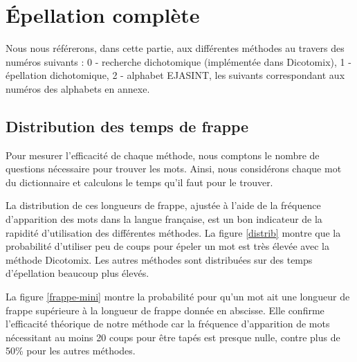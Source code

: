\documentclass[twoside,twocolumn]{article}
\begin{document}

\section{Épellation complète}

Nous nous référerons, dans cette partie, aux différentes méthodes au travers des numéros suivants : 0 - recherche dichotomique (implémentée dans Dicotomix), 1 - épellation dichotomique, 2 - alphabet EJASINT, les suivants correspondant aux numéros des alphabets en annexe.

\subsection{Distribution des temps de frappe}

Pour mesurer l'efficacité de chaque méthode, nous comptons le nombre de questions nécessaire pour trouver les mots. Ainsi, nous considérons chaque mot du dictionnaire et calculons le temps qu'il faut pour le trouver.

La distribution de ces longueurs de frappe, ajustée à l'aide de la fréquence d'apparition des mots dans la langue française, est un bon indicateur de la rapidité d'utilisation des différentes méthodes. La figure \ref{distrib} montre que la probabilité d'utiliser peu de coups pour épeler un mot est très élevée avec la méthode Dicotomix. Les autres méthodes sont distribuées sur des temps d'épellation beaucoup plus élevés. 

La figure \ref{frappe-mini} montre la probabilité pour qu'un mot ait une longueur de frappe supérieure à la longueur de frappe donnée en abscisse. Elle confirme l'efficacité théorique de notre méthode car la fréquence d'apparition de mots nécessitant au moins 20 coups pour être tapés est presque nulle, contre plus de 50\% pour les autres méthodes.
\end{document}
